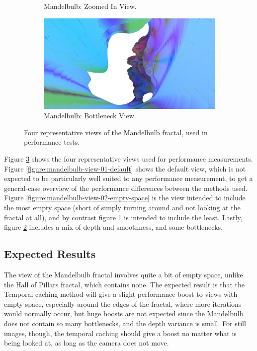 \begin{figure}[ht]
\begin{subfigure}[c]{0.45\linewidth}
		\caption{Mandelbulb: Zoomed In View.}
		\label{figure:mandelbulb-view-03-no-space}
	\end{subfigure}
	\hfill
	\begin{subfigure}[c]{0.45\linewidth}
		\includegraphics[width=\linewidth, frame]{Images/Results/Mandelbulb-View-04-Bottleneck.png}
		\caption{Mandelbulb: Bottleneck View.}
		\label{figure:mandelbulb-view-04-bottleneck}
	\end{subfigure}

	\caption{Four representative views of the Mandelbulb fractal, used in performance tests.}
	\label{figure:mandelbulb-views}
\end{figure}

Figure \ref{figure:mandelbulb-views} shows the four representative views used for performance measurements. Figure \ref{figure:mandelbulb-view-01-default} shows the default view, which is not expected to be particularly well suited to any performance measurement, to get a general-case overview of the performance differences between the methods used. Figure \ref{figure:mandelbulb-view-02-empty-space} is the view intended to include the most empty space (short of simply turning around and not looking at the fractal at all), and by contrast figure \ref{figure:mandelbulb-view-03-no-space} is intended to include the least. Lastly, figure \ref{figure:mandelbulb-view-04-bottleneck} includes a mix of depth and smoothness, and some bottlenecks.

\subsection{Expected Results}

The view of the Mandelbulb fractal involves quite a bit of empty space, unlike the Hall of Pillars fractal, which contains none. The expected result is that the Temporal caching method will give a slight performance boost to views with empty space, especially around the edges of the fractal, where more iterations would normally occur, but huge boosts are not expected since the Mandelbulb does not contain so many bottlenecks, and the depth variance is small. For still images, though, the temporal caching should give a boost no matter what is being looked at, as long as the camera does not move.\newline

